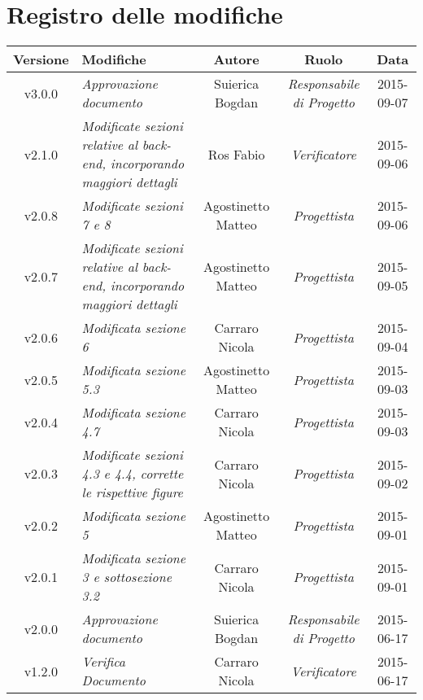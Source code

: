 \section*{Registro delle modifiche}

\begin{table}[h]
\centering
\begin{tabular}{|c|p{}|c|c|c|}
	\toprule
	\textbf{Versione} & \textbf{Modifiche} & \textbf{Autore} & \textbf{Ruolo} & \textbf{Data} \\
	\midrule
		v3.0.0 & \textit{Approvazione documento} & Suierica Bogdan & \textit{Responsabile di Progetto} & 2015-09-07\\
	\midrule
		v2.1.0 & \textit{Modificate sezioni relative al back-end, incorporando maggiori dettagli} & Ros Fabio & \textit{Verificatore} & 2015-09-06\\
	\midrule
		v2.0.8 & \textit{Modificate sezioni 7 e 8} & Agostinetto Matteo & \textit{Progettista} & 2015-09-06\\
	\midrule
		v2.0.7 & \textit{Modificate sezioni relative al back-end, incorporando maggiori dettagli} & Agostinetto Matteo & \textit{Progettista} & 2015-09-05\\
	\midrule
		v2.0.6 & \textit{Modificata sezione 6} & Carraro Nicola & \textit{Progettista} & 2015-09-04\\
	\midrule
		v2.0.5 & \textit{Modificata sezione 5.3} & Agostinetto Matteo & \textit{Progettista} & 2015-09-03\\
	\midrule
		v2.0.4 & \textit{Modificata sezione 4.7} & Carraro Nicola & \textit{Progettista} & 2015-09-03\\
	\midrule
		v2.0.3 & \textit{Modificate sezioni 4.3 e 4.4, corrette le rispettive figure} & Carraro Nicola & \textit{Progettista} & 2015-09-02\\
	\midrule
		v2.0.2 & \textit{Modificata sezione 5} & Agostinetto Matteo & \textit{Progettista} & 2015-09-01\\
	\midrule
		v2.0.1 & \textit{Modificata sezione 3 e sottosezione 3.2} & Carraro Nicola & \textit{Progettista} & 2015-09-01\\
	\midrule
		v2.0.0 & \textit{Approvazione documento} & Suierica Bogdan & \textit{Responsabile di Progetto} & 2015-06-17\\
	\midrule
		v1.2.0 & \textit{Verifica Documento} & Carraro Nicola & \textit{Verificatore} & 2015-06-17\\
	\bottomrule
	\end{tabular}
\end{table}


